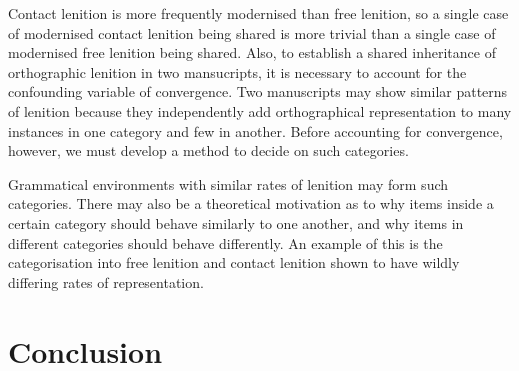 
Contact lenition is more frequently modernised than free lenition, so a single case of modernised contact lenition being shared is more trivial than a single case of modernised free lenition being shared. 
Also, to establish a shared inheritance of orthographic lenition in two mansucripts,  it is necessary to account for the confounding variable of convergence. Two manuscripts may show similar patterns of lenition because they independently add orthographical representation to many instances in one category and few in another. Before accounting for convergence, however, we must develop a method to decide on such categories.

Grammatical environments with similar rates of lenition may form such categories. There may also be a theoretical motivation as to why items inside a certain category should behave similarly to one another, and why items in different categories should behave differently. An example of this is the categorisation into free lenition and contact lenition shown to have wildly differing rates of representation.

\section{Conclusion}
\label{sec:dewi-conclusion}

